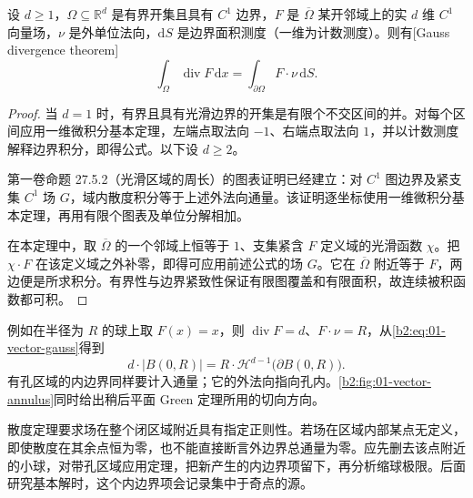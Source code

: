 \begin{theorem}\label{b2:thm:01-vector-gauss}
设 \(d\geq1\)，\(\Omega\subseteq\mathbb R^d\) 是有界开集且具有 \(C^1\) 边界，\(F\) 是 \(\overline\Omega\) 某开邻域上的实 \(d\) 维 \(C^1\) 向量场，\(\nu\) 是外单位法向，\(\mathrm dS\) 是边界面积测度（一维为计数测度）。则有[Gauss divergence theorem]
\begin{equation}\label{b2:eq:01-vector-gauss}
 \int_\Omega\operatorname{div}F\,\mathrm dx
 =\int_{\partial\Omega}F\cdot\nu\,\mathrm dS.
\end{equation}
\end{theorem}
\begin{proof}
当 \(d=1\) 时，有界且具有光滑边界的开集是有限个不交区间的并。对每个区间应用一维微积分基本定理，左端点取法向 \(-1\)、右端点取法向 \(1\)，并以计数测度解释边界积分，即得公式。以下设 \(d\geq2\)。

第一卷命题 27.5.2（光滑区域的周长）的图表证明已经建立：对 \(C^1\) 图边界及紧支集 \(C^1\) 场 \(G\)，域内散度积分等于上述外法向通量。该证明逐坐标使用一维微积分基本定理，再用有限个图表及单位分解相加。

在本定理中，取 \(\overline\Omega\) 的一个邻域上恒等于 \(1\)、支集紧含 \(F\) 定义域的光滑函数 \(\chi\)。把 \(\chi\cdot F\) 在该定义域之外补零，即得可应用前述公式的场 \(G\)。它在 \(\overline\Omega\) 附近等于 \(F\)，两边便是所求积分。有界性与边界紧致性保证有限图覆盖和有限面积，故连续被积函数都可积。
\end{proof}

例如在半径为 \(R\) 的球上取 \(F(x)=x\)，则 \(\operatorname{div}F=d\)、\(F\cdot\nu=R\)，从\eqref{b2:eq:01-vector-gauss}得到
\[
 d\cdot|B(0,R)|=R\cdot\mathcal H^{d-1}\bigl(\partial B(0,R)\bigr).
\]
有孔区域的内边界同样要计入通量；它的外法向指向孔内。\cref{b2:fig:01-vector-annulus}同时给出稍后平面 Green 定理所用的切向方向。

\ProseParagraphBreak

散度定理要求场在整个闭区域附近具有指定正则性。若场在区域内部某点无定义，即使散度在其余点恒为零，也不能直接断言外边界总通量为零。应先删去该点附近的小球，对带孔区域应用定理，把新产生的内边界项留下，再分析缩球极限。后面研究基本解时，这个内边界项会记录集中于奇点的源。

